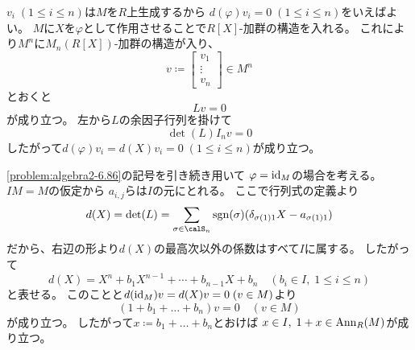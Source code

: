 \documentclass[report]{jlreq}
\begin{document}
\begin{answer}
    $v_i \; (1 \le i \le n)$は$M$を$R$上生成するから
    $d(\varphi) v_i = 0 \; (1 \le i \le n)$をいえばよい。
    $M$に$X$を$\varphi$として作用させることで$R[X]$-加群の構造を入れる。
    これにより$M^n$に$M_n(R[X])$-加群の構造が入り、
    \begin{equation}
        v \coloneqq \begin{bmatrix}
            v_1 \\
            \vdots \\
            v_n
        \end{bmatrix}
        \in M^n
    \end{equation}
    とおくと
    \begin{equation}
        Lv = 0
    \end{equation}
    が成り立つ。
    左から$L$の余因子行列を掛けて
    \begin{equation}
        \det(L) I_n v = 0
    \end{equation}
    したがって$d(\varphi) v_i = d(X) v_i = 0 \; (1 \le i \le n)$が成り立つ。
\end{answer}


\begin{answer}
    \cref{problem:algebra2-6.86}の記号を引き続き用いて
    $\varphi = \mathrm{id}_M$の場合を考える。
    $IM = M$の仮定から
    $a_{i, j}$らは$I$の元にとれる。
    ここで行列式の定義より
    \begin{equation}
        d(X) = \det(L) = \sum_{\sigma \in \calS_n}
            \sgn(\sigma)
            (\delta_{\sigma(1) 1} X - a_{\sigma(1) 1})
    \end{equation}
    だから、右辺の形より$d(X)$の最高次以外の係数はすべて$I$に属する。
    したがって
    \begin{equation}
        d(X) = X^n + b_1 X^{n - 1} + \cdots + b_{n - 1} X + b_n
            \quad
            (b_i \in I, \; 1 \le i \le n)
    \end{equation}
    と表せる。
    このことと$d(\mathrm{id}_M)v = d(X)v = 0 \; (v \in M)$より
    \begin{equation}
        (1 + b_1 + \dots + b_n) v = 0
            \quad
            (v \in M)
    \end{equation}
    が成り立つ。
    したがって$x \coloneqq b_1 + \dots + b_n$とおけば
    $x \in I, \; 1 + x \in \operatorname{Ann}_R(M)$が成り立つ。
\end{answer}
\end{document}
